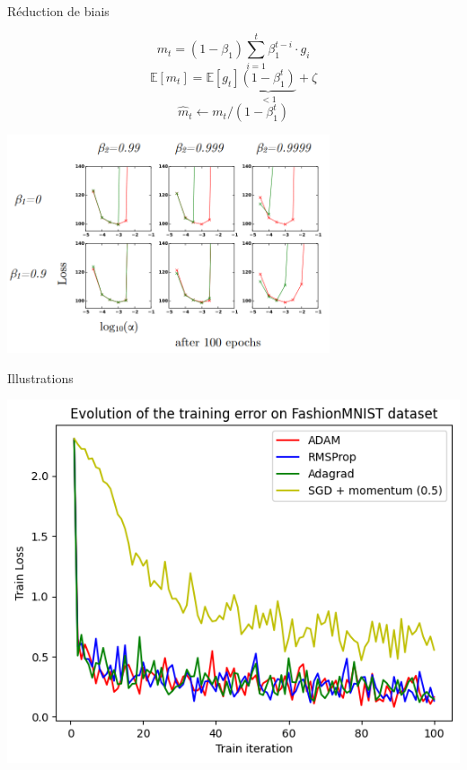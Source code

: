 \documentclass[11pt,aspectratio=169,xcolor=dvipsnames, french]{beamer}
\begin{document}
\begin{frame}{Réduction de biais}
	\begin{minipage}[c]{.3\linewidth}
	$$m_t=(1-\beta_1)\displaystyle\sum_{i=1}^t\beta_1^{t-i}\cdotp g_i$$
$$\mathbb E[m_t]
= \mathbb E[g_t]\underset{<1}{\underbrace{(1-\beta_1^t)}}+\zeta$$
$$\widehat m_t \longleftarrow m_t/(1-\beta_1^t)$$
	\end{minipage} \hfill
	\begin{minipage}[c]{.65\linewidth}
\includegraphics[width=9.5cm]{../Images/bias_epochs100.png}

	\end{minipage}
\end{frame}








\begin{frame}{Illustrations}
\begin{center}
  \includegraphics[width=0.45\linewidth]{../Images/FashionMNIST.png} 
\end{center}
\end{frame}
\end{document}
